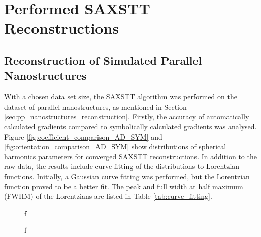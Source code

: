 \chapter{Performed SAXSTT Reconstructions}

\section{Reconstruction of Simulated Parallel Nanostructures}
\label{sec:reconstruction_parallel}

With a chosen data set size,
the SAXSTT algorithm was performed on the dataset of parallel nanostructures, as mentioned in Section \ref{sec:pp_nanostructures_reconstruction}.
Firstly, the accuracy of automatically calculated gradients compared to symbolically calculated gradients was analysed.
Figure \ref{fig:coefficient_comparison_AD_SYM} and \ref{fig:orientation_comparison_AD_SYM} show distributions of spherical harmonics parameters for converged SAXSTT reconstructions.
In addition to the raw data, the results include curve fitting of the distributions to Lorentzian functions. %
Initially, a Gaussian curve fitting was performed, but the Lorentzian function proved to be a better fit.
The peak and full width at half maximum (FWHM) of the Lorentzians are listed in Table \ref{tab:curve_fitting}.

\begin{figure}[h!]
    \centering
    
    \caption{  f  }
    \label{fig:coefficient_comparison_AD_SYM_difficult}
\end{figure}

\begin{figure}[h!]
    \centering
    
    \caption{  f  }
    \label{fig:orientation_comparison_AD_SYM_difficult}
\end{figure}


